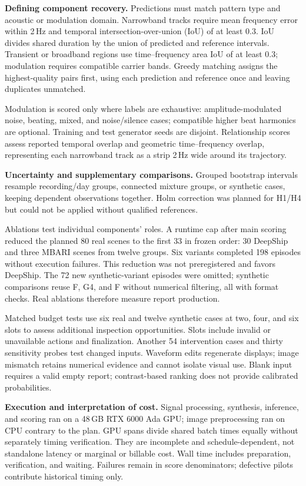 \documentclass[runningheads,orivec]{llncs}
\begin{document}
\textbf{Defining component recovery.}
Predictions must match pattern type and acoustic or modulation domain. Narrowband tracks require mean frequency error within 2\,Hz and temporal intersection-over-union (IoU) of at least 0.3. IoU divides shared duration by the union of predicted and reference intervals. Transient or broadband regions use time--frequency area IoU of at least 0.3; modulation requires compatible carrier bands. Greedy matching assigns the highest-quality pairs first, using each prediction and reference once and leaving duplicates unmatched.

Modulation is scored only where labels are exhaustive: amplitude-modulated noise, beating, mixed, and noise/silence cases; compatible higher beat harmonics are optional. Training and test generator seeds are disjoint. Relationship scores assess reported temporal overlap and geometric time--frequency overlap, representing each narrowband track as a strip 2\,Hz wide around its trajectory.

\textbf{Uncertainty and supplementary comparisons.}
Grouped bootstrap intervals resample recording/day groups, connected mixture groups, or synthetic cases, keeping dependent observations together. Holm correction was planned for H1/H4 but could not be applied without qualified references.

Ablations test individual components' roles. A runtime cap after main scoring reduced the planned 80 real scenes to the first 33 in frozen order: 30 DeepShip and three MBARI scenes from twelve groups. Six variants completed 198 episodes without execution failures. This reduction was not preregistered and favors DeepShip. The 72 new synthetic-variant episodes were omitted; synthetic comparisons reuse F, G4, and F without numerical filtering, all with format checks. Real ablations therefore measure report production.

Matched budget tests use six real and twelve synthetic cases at two, four, and six slots to assess additional inspection opportunities. Slots include invalid or unavailable actions and finalization. Another 54 intervention cases and thirty sensitivity probes test changed inputs. Waveform edits regenerate displays; image mismatch retains numerical evidence and cannot isolate visual use. Blank input requires a valid empty report; contrast-based ranking does not provide calibrated probabilities.

\textbf{Execution and interpretation of cost.}
Signal processing, synthesis, inference, and scoring ran on a 48\,GB RTX 6000 Ada GPU; image preprocessing ran on CPU contrary to the plan. GPU spans divide shared batch times equally without separately timing verification. They are incomplete and schedule-dependent, not standalone latency or marginal or billable cost. Wall time includes preparation, verification, and waiting. Failures remain in score denominators; defective pilots contribute historical timing only.
\end{document}
